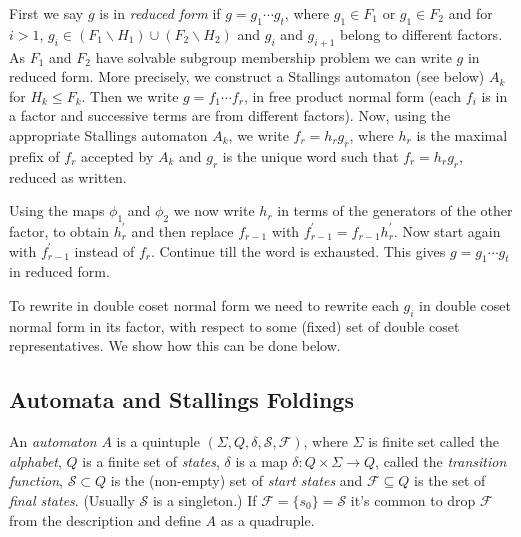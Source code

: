 \documentclass[a4paper,12pt]{article}
\renewcommand{\d}{\delta }
\renewcommand{\S}{\Sigma }
\numberwithin{equation}{section}
\numberwithin{figure}{section}
\newcommand{\maps}{\rightarrow}
\begin{document}
First we say $g$ is in \emph{reduced form} if $g = g_1 \cdots g_t$, where
$g_1 \in F_1$ or $g_1 \in F_2$ and
for
$i > 1$,    $g_i \in (F_1 \backslash H_1)\cup (F_2\backslash H_2)$ and  $g_i$
and  ${g_{i+1}}$ belong to  different factors. As $F_1$ and
$F_2$ have solvable subgroup membership problem we can write $g$ in
reduced form. More precisely, we construct a Stallings automaton
(see below) $A_k$ for
$H_k\le F_k$. %
Then we write $g=f_1\cdots f_r$, in free product normal
form (each $f_i$ is in a factor and successive terms are
from different factors).
Now,
using the appropriate Stallings automaton $A_k$, we write $f_r=h_rg_r$, where
$h_r$ is the maximal prefix of $f_r$ accepted by $A_k$ and $g_r$ is
 the
unique word such that $f_r=h_rg_r$, reduced as written.

Using the maps $\phi_1$ and $\phi_2$ we now write $h_r$ in terms of the
generators of the other factor, to obtain $h^\prime_r$ and then
replace $f_{r-1}$ with $f_{r-1}^\prime=f_{r-1}h^\prime_r$. Now start again with
$f_{r-1}^\prime$ instead of $f_r$. Continue till the word is exhausted.
This gives $g=g_1\cdots g_t$ in reduced form.

To rewrite in double coset normal form we need to
 rewrite
each $g_i$ in double coset normal form in its factor, with respect
to some (fixed) set of double coset representatives. We show how
this can be done below.

\subsection{Automata and Stallings Foldings}\label{sub:foldings}

An {\em automaton} $A$ is  a quintuple
$(\S,Q,\d,\mathcal{S},\mathcal{F})$, where $\S$ is finite set
called the {\em alphabet}, $Q$ is a finite set of {\em states},
$\d$ is a map $\d:Q\times \S\maps Q$, called the {\em transition
function}, $\mathcal{S}\subset Q$ is the (non-empty) set of {\em
start states} and $\mathcal{F}\subseteq Q$ is the set of {\em
final states}. (Usually $\mathcal{S}$ is a singleton.) If
$\mathcal{F}=\{s_0\}=\mathcal{S}$ it's common to drop
$\mathcal{F}$ from the description and define $A$ as a quadruple.
\end{document}
